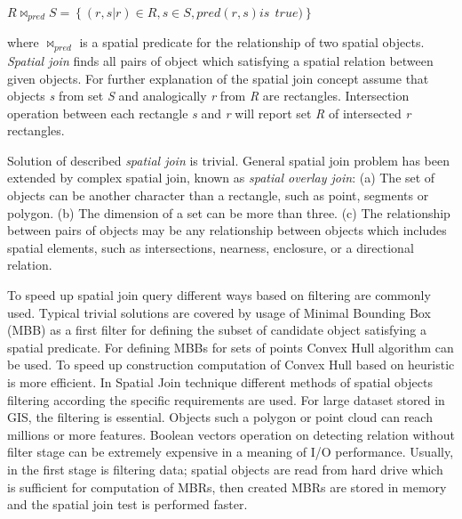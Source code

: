 \documentclass[a4paper,12pt,oneside]{report}
\begin{document}
\begin{center}
$R\bowtie_{pred}S=\left \{ \left ( r,s|r  \right )\in R,s \in S, pred(r,s) is \ \ true) \right \}  $
\end{center}
where $\bowtie_{pred}$ is a spatial predicate for the relationship of two
spatial objects. 
\linebreak 
\textit{Spatial join} finds all pairs of object which satisfying a spatial relation between given objects. 
For further explanation of the spatial join concept assume that  objects \emph{s} from set \emph{S} and 
analogically  \emph{r} from \emph{R} are rectangles. Intersection operation between each rectangle \emph{s} 
and \emph{r} will report set \emph{R} of intersected \emph{r} rectangles.

Solution of described \textit{spatial join} is trivial. General spatial join problem has been extended by 
complex spatial join, known as \textit{spatial overlay join}\cite{spatial_join}: (a) The set of objects
can be another character than a rectangle, such as point, segments or polygon. (b) The dimension of a set 
can be more than three. (c) The relationship between pairs of objects may be any relationship between 
objects which includes spatial elements, such as intersections, nearness, enclosure, or a directional relation. 

To speed up spatial join query different ways based on filtering are commonly used.
Typical trivial solutions are covered by usage of Minimal Bounding Box (MBB) as a first 
filter for defining the subset of candidate object satisfying a spatial predicate. For defining MBBs for 
sets of points Convex Hull algorithm can be used. 
To speed up construction computation  of Convex Hull based on heuristic \cite{covex_hull} is more efficient. 
In Spatial Join technique \cite{spatial_join}  different methods of  spatial objects filtering according the specific requirements are used. For large dataset stored in GIS, the filtering is essential. Objects such a polygon 
or point cloud can reach millions or more features. Boolean vectors operation on detecting relation without filter stage 
can be extremely expensive in a meaning of I/O performance. Usually, in the first stage is filtering data; spatial objects 
are read from hard drive which is sufficient for computation of MBRs, then created MBRs are 
stored in memory and the spatial join test is performed faster.
\end{document}
